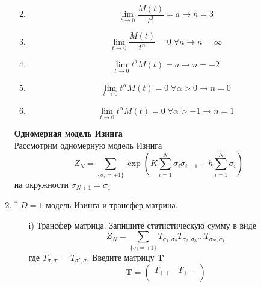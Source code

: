 \documentclass[12pt]{article}
\theoremstyle{definition}
\begin{document}
\begin{enumerate}
\begin{enumerate}
\begin{equation}
    \end{equation}
    \item \begin{equation}
        \lim\limits_{t\rightarrow0}\frac{M(t)}{t^3}=a\rightarrow \boxed{n=3}
    \end{equation}
    \item \begin{equation}
        \lim\limits_{t\rightarrow0}\frac{M(t)}{t^n}=0\;\forall n\rightarrow \boxed{n=\infty}
    \end{equation}
    \item \begin{equation}
        \lim\limits_{t\rightarrow0}t^2M(t)=a\rightarrow \boxed{n=-2}
        \end{equation}
    \item \begin{equation}
        \lim\limits_{t\rightarrow0}t^\alpha M(t)=0\;\forall\alpha>0\rightarrow \boxed{n=0}
        \end{equation}
    \item \begin{equation}
        \lim\limits_{t\rightarrow0}t^\alpha M(t)=0\;\forall\alpha>-1\rightarrow \boxed{n=1}
        \end{equation}
    \end{enumerate}
    \textbf{Одномерная модель Изинга}\\
    Рассмотрим одномерную модель Изинга
    \begin{equation}
        Z_N=\sum\limits_{\{\sigma_i=\pm1\}}\exp\left(K\sum\limits_{i=1}^N\sigma_i\sigma_{i+1}+h\sum\limits_{i=1}^N\sigma_i\right)
    \end{equation}
    на окружности $\sigma_{N+1}=\sigma_1$
    \item$^*$ $D=1$ модель Изинга и трансфер матрица.
    \begin{itemize}
        \item[i)] Трансфер матрица. Запишите статистическую сумму в виде
        \begin{equation}
            Z_N=\sum\limits_{\{\sigma_i=\pm1\}}T_{\sigma_1,\sigma_2}T_{\sigma_2,\sigma_3}...T_{\sigma_N,\sigma_1}
        \end{equation}
        где $T_{\sigma,\sigma'}=T_{\sigma',\sigma}$. Введите матрицу $\textbf{T}$
        \begin{equation}
            \textbf{T}=\begin{pmatrix}
            T_{++} & T_{+-}\\

\end{pmatrix}
\end{equation}
\end{itemize}
\end{enumerate}
\end{document}
